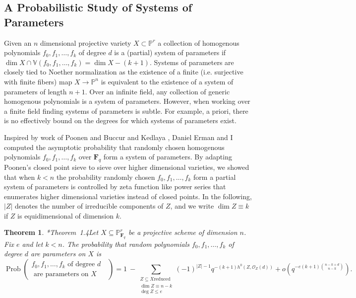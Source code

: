 \documentclass[11pt,reqno]{amsart}
\newtheorem{theorem}[lemma]{Theorem}
\theoremstyle{remark}
\newcommand{\Prob}{\operatorname{Prob}}
\newcommand{\fF}{\mathbf F}
\renewcommand{\O}{\mathcal{O}}
\renewcommand{\P}{\mathbb{P}}
\newcommand{\V}{\mathbb{V}}
\begin{document}
\subsection{A Probabilistic Study of Systems of Parameters} 

Given an $n$ dimensional projective variety $X\subset \P^r$ a collection of homogenous polynomials $f_{0},f_{1},\ldots,f_{k}$ of degree $d$ is a (partial) system of parameters if $\dim X\cap \V(f_{0},f_{1},\ldots,f_{k}) = \dim X - (k+1)$. Systems of parameters are closely tied to Noether normalization as the existence of a finite (i.e. surjective with finite fibers) map $X\rightarrow \P^n$ is equivalent to the existence of a system of parameters of length $n+1$. Over an infinite field, any collection of generic homogenous polynomials is a system of parameters. However, when working over a finite field finding systems of parameters is subtle. For example, a priori, there is no effectively bound on the degrees for which systems of parameters exist. 

Inspired by work of Poonen \cite{poonen04} and Buccur and Kedlaya \cite{bucurKedlaya12}, Daniel Erman and I computed the asymptotic probability that randomly chosen homogenous polynomials $f_{0},f_{1},\ldots,f_{k}$ over $\fF_{q}$ form a system of parameters. By adapting Poonen's closed point sieve to sieve over higher dimensional varieties, we showed that when $k<n$ the probability randomly chosen $f_{0},f_{1},\ldots,f_{k}$ form a partial system of parameters is controlled by zeta function like power series that enumerates higher dimensional varieties instead of closed points. In the following, $|Z|$ denotes the number of irreducible components of $Z$, and we write $\dim Z \equiv k$ if $Z$ is equidimensional of dimension $k$. 

\begin{theorem}\cite{bruceErman-sop}*{Theorem~1.4}\label{thm:main finite field}
Let $X\subseteq \P^r_{\fF_q}$ be a projective scheme of dimension $n$. Fix $e$ and let $k<n$. The probability that random polynomials $f_0,f_1,\dots,f_k$ of degree $d$ are parameters on $X$ is
\[
\Prob\left(\begin{matrix}f_0,f_1,\dots,f_{k} \text{ of degree $d$ } \\ \text{ are parameters on $X$}\end{matrix}\right) = 1 \ - 
\sum_{\begin{smallmatrix}Z\subseteq X \text{reduced} \\ \dim Z \equiv n-k\\ \deg Z \leq e  \end{smallmatrix}}(-1)^{|Z|-1}q^{-(k+1)h^0(Z,\O_Z(d))}+ o\left(q^{-e(k+1)\binom{n-k+d}{n-k}}\right).
\]
\end{theorem}
\end{document}
